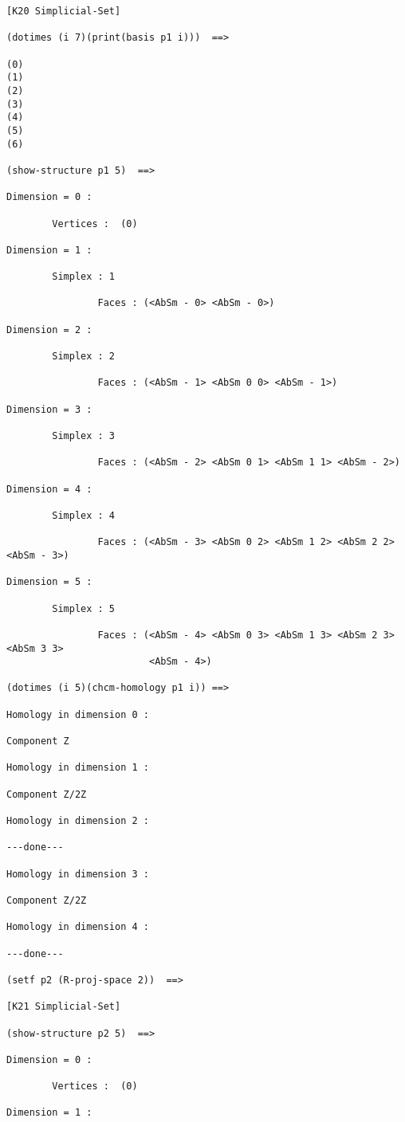 {{\begin{verbatim}
[K20 Simplicial-Set]

(dotimes (i 7)(print(basis p1 i)))  ==>

(0) 
(1) 
(2) 
(3) 
(4) 
(5) 
(6) 

(show-structure p1 5)  ==>

Dimension = 0 :

        Vertices :  (0)

Dimension = 1 :

        Simplex : 1

                Faces : (<AbSm - 0> <AbSm - 0>)

Dimension = 2 :

        Simplex : 2

                Faces : (<AbSm - 1> <AbSm 0 0> <AbSm - 1>)

Dimension = 3 :

        Simplex : 3

                Faces : (<AbSm - 2> <AbSm 0 1> <AbSm 1 1> <AbSm - 2>)

Dimension = 4 :

        Simplex : 4

                Faces : (<AbSm - 3> <AbSm 0 2> <AbSm 1 2> <AbSm 2 2> <AbSm - 3>)

Dimension = 5 :

        Simplex : 5

                Faces : (<AbSm - 4> <AbSm 0 3> <AbSm 1 3> <AbSm 2 3> <AbSm 3 3> 
                         <AbSm - 4>)

(dotimes (i 5)(chcm-homology p1 i)) ==>

Homology in dimension 0 :

Component Z

Homology in dimension 1 :

Component Z/2Z

Homology in dimension 2 :

---done---

Homology in dimension 3 :

Component Z/2Z

Homology in dimension 4 :

---done---

(setf p2 (R-proj-space 2))  ==>

[K21 Simplicial-Set]

(show-structure p2 5)  ==>

Dimension = 0 :

        Vertices :  (0)

Dimension = 1 :


\end{verbatim}}}
